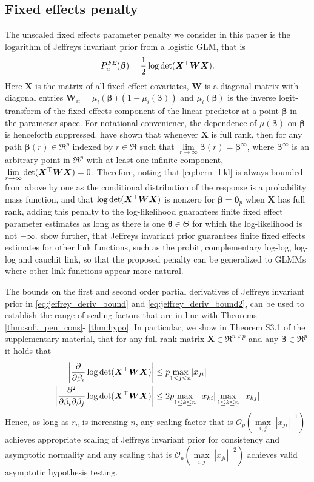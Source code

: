 \documentclass[11pt, a4paper]{article}
\newcommand*{\bb}{\boldsymbol}
\newcommand{\Op}[1]{\ensuremath{{\mathcal{O}_p(#1)}}}
\theoremstyle{example} \newtheorem{example}{Example}[section]
\theoremstyle{theorem} \newtheorem{theorem}{Theorem}[section]
\def\det{{\mathop{\rm det}}}
\def\bbeta{\bb{\beta}}
\def\btheta{\bb{\theta}}
\def\b0{\bb{0}}
\def\bX{\bb{X}}
\def\bW {\bb{W}}
\begin{document}
\subsection{Fixed effects penalty}
\label{sec:glmm_fe_pen}
The unscaled fixed effects parameter penalty we consider in this paper is the logarithm of Jeffreys invariant prior from a logistic GLM, that is $$P_u^{\textit{FE}}(\bbeta) =  \frac{1}{2}\log \det(\bX^\top \bW \bX).$$ Here $\bX$ is the matrix of all fixed effect covariates, $\bW$ is a diagonal matrix with diagonal entries $\bW_{ii} = \mu_i(\bbeta) (1-\mu_i(\bbeta))$ and $\mu_i(\bbeta)$ is the inverse logit-transform of the fixed effects component of the linear predictor at a point $\bbeta$ in the parameter space. For notational convenience, the dependence of $\mu(\bbeta)$ on $\bbeta$ is henceforth suppressed. \citet[Theorem 1]{kosmidis+firth:2020} have shown that whenever $\bX$ is full rank, then for any path $\bbeta(r) \in \Re^p$ indexed by $r \in \Re$ such that $\lim\limits_{r \to \infty} \bbeta(r) = \bbeta^\infty$, where $\bbeta^\infty$ is an arbitrary point in $\Re^p$ with at least one infinite component, $\lim\limits_{r \to \infty} \det(\bX^\top\bW\bX) = 0$. Therefore, noting that \eqref{eq:bern_likl} is always bounded from above by one as the conditional distribution of the response is a probability mass function, and that $\log \det (\bX^\top \bW \bX)$ is nonzero for $\bbeta=\b0_p$ when $\bX$ has full rank, adding this penalty to the log-likelihood guarantees finite fixed effect parameter estimates as long as there is one $\btheta \in \Theta$ for which the log-likelihood is not $-\infty$. \citet{kosmidis+firth:2020} show further, that Jeffreys invariant prior guarantees finite fixed effects estimates for other link functions, such as the probit, complementary log-log, log-log and cauchit link, so that the proposed penalty can be generalized to GLMMs where other link functions appear more natural. 

The bounds on the first and second order partial derivatives of Jeffreys invariant prior in \eqref{eq:jeffrey_deriv_bound} and \eqref{eq:jeffrey_deriv_bound2}, can be used to establish the range of scaling factors that are in line with Theorems \ref{thm:soft_pen_cons}- \ref{thm:hypo}. In particular, we show in Theorem S3.1 of the supplementary material, that for any full rank matrix $\bX \in \Re^{n \times p}$ and any $\bbeta \in \Re^p$ it holds that 
\begin{align}\label{eq:jeffrey_deriv_bound}
\left|\frac{\partial }{\partial \beta_i}\log \textrm{det}(\bX^\top\bW\bX)\right| & \leq p\underset{1\leq j\leq n}{\max} |x_{ji}| \\ \label{eq:jeffrey_deriv_bound2}
\left|\frac{\partial^2}{\partial \beta_i \partial \beta_j} \log\det (\bX^\top \bW \bX) \right| &\leq 2p\underset{1\leq k \leq n}{\max} \; \left|x_{ki}\right| \underset{1\leq k \leq n}{\max} \; \left|x_{kj}\right|  
\end{align}
Hence, as long as $r_n$ is increasing $n$, any scaling factor that is $\Op{\underset{i,j}{\max} \; |x_{ji}|^{-1}}$ achieves appropriate scaling of Jeffreys invariant prior for consistency and asymptotic normality and any scaling that is $\Op{\underset{i,j}{\max} \; |x_{ji}|^{-2}}$ achieves valid asymptotic hypothesis testing. 
\end{document}
